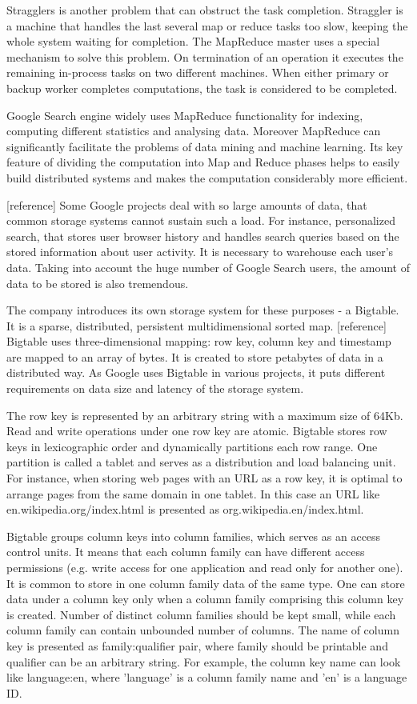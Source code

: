 Stragglers is another problem that can obstruct the task completion.
Straggler is a machine that handles the last several map or reduce tasks too slow, keeping the whole system waiting for completion.
The MapReduce master uses a special mechanism to solve this problem.
On termination of an operation it executes the remaining in-process tasks on two different machines.
When either primary or backup worker completes computations, the task is considered to be completed.

Google Search engine widely uses MapReduce functionality for indexing, computing different statistics and analysing data.  
Moreover MapReduce can significantly facilitate the problems of data mining and machine learning.
Its key feature of dividing the computation into Map and Reduce phases helps to easily build distributed systems and makes the computation considerably more efficient.  

[reference]
Some Google projects deal with so large amounts of data, that common storage systems cannot sustain such a load.
For instance, personalized search, that stores user browser history and handles search queries based on the stored information about user activity.
It is necessary to warehouse each user's data.
Taking into account the huge number of Google Search users, the amount of data to be stored is also tremendous. 

The company introduces its own storage system for these purposes - a Bigtable.
It is a sparse, distributed, persistent multidimensional sorted map. [reference]
Bigtable uses three-dimensional mapping: row key, column key and timestamp are mapped to an array of bytes.
It is created to store petabytes of data in a distributed way.
As Google uses Bigtable in various projects, it puts different requirements on data size and latency of the storage system. 

The row key is represented by an arbitrary string with a maximum size of 64Kb.
Read and write operations under one row key are atomic.
Bigtable stores row keys in lexicographic order and dynamically partitions each row range.
One partition is called a tablet and serves as a distribution and load balancing unit.
For instance, when storing web pages with an URL as a row key, it is optimal to arrange pages from the same domain in one tablet.
In this case an URL like en.wikipedia.org/index.html is presented as org.wikipedia.en/index.html.

Bigtable groups column keys into column families, which serves as an access control units.
It means that each column family can have different access permissions (e.g. write access for one application and read only for another one).
It is common to store in one column family data of the same type.
One can store data under a column key only when a column family comprising this column key is created.
Number of distinct column families should be kept small, while each column family can contain unbounded number of columns.
The name of column key is presented as family:qualifier pair, where family should be printable and qualifier can be an arbitrary string.
For example, the column key name can look like language:en, where 'language' is a column family name and 'en' is a language ID. 

